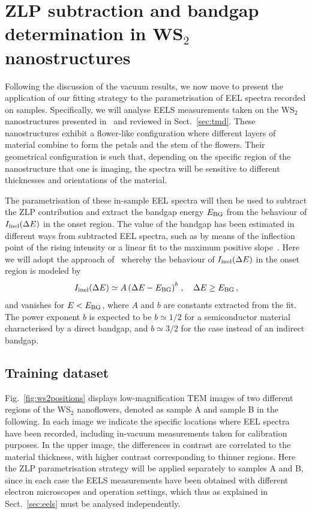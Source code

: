 \section{ZLP subtraction and bandgap determination in WS$_2$ nanostructures}
\label{sec:results_sample}

Following the discussion of the vacuum results, we now move
to present the application of our fitting strategy to the parametrisation
of EEL spectra recorded on samples.
%
Specifically, we will analyse EELS measurements taken on the WS$_2$ nanostructures
presented in~\cite{SabryaWS2} and reviewed in Sect.~\ref{sec:tmd}.
%
These nanostructures exhibit a flower-like configuration where different layers
of material combine to form the petals and the stem of the flowers.
%
Their geometrical configuration is such that, depending on the specific region
of the nanostructure that one is imaging, the spectra will be sensitive
to different thicknesses and orientations of the material.

The parametrisation of these in-sample EEL spectra will then be used
to subtract the ZLP contribution and extract the bandgap energy $E_{\rm BG}$ from
the behaviour of $I_{\rm inel}(\Delta E)$ in the onset region.
%
The value of the bandgap  has been estimated in different ways
from subtracted EEL spectra, such as by means of the inflection point of the rising intensity or
a linear fit to the maximum positive slope~\cite{Schamm:2003}.
%
Here we will adopt the approach of~\cite{Rafferty:2000} whereby the behaviour
of $I_{\rm inel}(\Delta E)$ in the onset region is  modeled by
\begin{equation}
  \label{eq:I1}
    I_{\rm inel}(\Delta E) \simeq  A \left( \Delta E-E_{\rm BG} \right)^{b} \, , \quad \Delta E \ge E_{\rm BG} \, ,
\end{equation}
and vanishes for $E < E_{\rm BG}$, where $A$ and $b$ are constants extracted from the fit.
%
The power exponent $b$ is expected to be $b\simeq 1/2$ for a semiconductor material characterised
by a direct bandgap, and $b\simeq 3/2$ for the case instead of an indirect bandgap.

\subsection{Training dataset}
%
Fig.~\ref{fig:ws2positions} displays
low-magnification TEM images of two different regions of
the WS$_2$ nanoflowers, denoted as sample A and sample B in the following.
%
In each image we indicate the specific locations where
EEL spectra have been recorded, including in-vacuum measurements taken
for calibration purposes.
%
In the upper image, the differences in contrast are correlated to the material
thickness, with higher contrast corresponding to thinner regions.
%
Here the ZLP parametrisation strategy will be applied separately
to samples A and B, since in each case the EELS measurements have
been obtained with different electron microscopes and
operation settings, which thus as explained in Sect.~\ref{sec:eels}
must be analysed independently.

